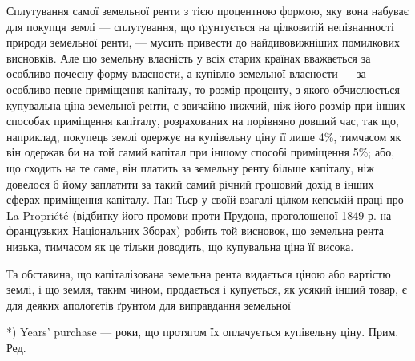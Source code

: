 Сплутування самої земельної ренти з тією процентною формою, яку вона
набуває для покупця землі — сплутування, що ґрунтується на цілковитій
непізнанності природи земельної ренти, — мусить привести до найдивовижніших
помилкових висновків. Але що земельну власність у всіх старих країнах
вважається за особливо почесну форму власности, а купівлю земельної власности
— за особливо певне приміщення капіталу, то розмір проценту, з якого
обчислюється купувальна ціна земельної ренти, є звичайно нижчий, ніж його розмір
при інших способах приміщення капіталу, розрахованих на порівняно довший час,
так що, наприклад, покупець землі одержує на купівельну ціну її лише 4\%, тимчасом
як він одержав би на той самий капітал при іншому способі приміщення 5\%;
або, що сходить на те саме, він платить за земельну ренту більше капіталу,
ніж довелося б йому заплатити за такий самий річний грошовий дохід в інших
сферах приміщення капіталу. Пан Тьєр у своїй взагалі цілком кепській праці про
La Propriété (відбитку його промови проти Прудона, проголошеної 1849 р. на французьких
Національних Зборах) робить той висновок, що земельна рента низька,
тимчасом як це тільки доводить, що купувальна ціна її висока.

Та обставина, що капіталізована земельна рента видається ціною або
вартістю землі, і що земля, таким чином, продається і купується, як усякий
інший товар, є для деяких апологетів ґрунтом для виправдання земельної

*) Years’ purchase — роки, що протягом їх оплачується купівельну ціну. Прим. Ред.
